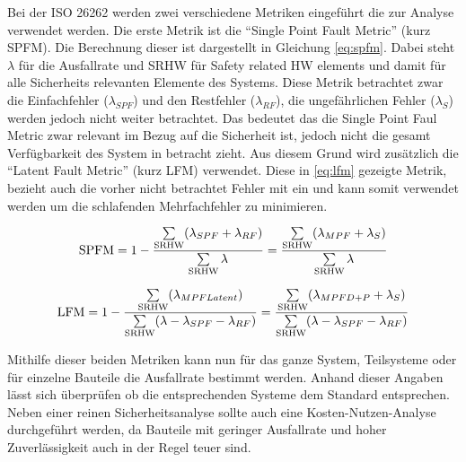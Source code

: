 \documentclass[a4paper,DIV=calc,ngerman]{scrartcl}
\begin{document}
Bei der ISO 26262 werden zwei verschiedene Metriken eingeführt die zur Analyse verwendet werden. Die erste Metrik ist die "`Single Point Fault Metric"' (kurz SPFM). Die Berechnung dieser ist dargestellt in Gleichung \ref{eq:spfm}. Dabei steht $ \lambda $ für die Ausfallrate und SRHW für Safety related HW elements und damit für alle Sicherheits relevanten Elemente des Systems. Diese Metrik betrachtet zwar die Einfachfehler ($ \lambda_{SPF} $) und den Restfehler ($ \lambda_{RF} $), die ungefährlichen Fehler ($ \lambda_{S} $) werden jedoch nicht weiter betrachtet. Das bedeutet das die Single Point Faul Metric zwar relevant im Bezug auf die Sicherheit ist, jedoch nicht die gesamt Verfügbarkeit des System in betracht zieht. Aus diesem Grund wird zusätzlich die "`Latent Fault Metric"' (kurz LFM) verwendet. Diese in \ref{eq:lfm} gezeigte Metrik, bezieht auch die vorher nicht betrachtet Fehler mit ein und kann somit verwendet werden um die schlafenden Mehrfachfehler zu minimieren. 


\begin{equation}
\textnormal{SPFM} = 1 - \frac{\sum\limits_{\textnormal{SRHW}} (\lambda_{SPF} + \lambda_{RF})}{\sum\limits_{\textnormal{SRHW}} \lambda} = \frac{\sum\limits_{\textnormal{SRHW}} (\lambda_{MPF} + \lambda_{S})}{\sum\limits_{\textnormal{SRHW}} \lambda}
\label{eq:spfm}
\end{equation}

\begin{equation}
\textnormal{LFM} = 1 - \frac{\sum\limits_{\textnormal{SRHW}} (\lambda_{MPF Latent})}{\sum\limits_{\textnormal{SRHW}} (\lambda - \lambda_{SPF} - \lambda_{RF})} = \frac{\sum\limits_{\textnormal{SRHW}} (\lambda_{MPF D+P} + \lambda_{S})}{\sum\limits_{\textnormal{SRHW}} (\lambda - \lambda_{SPF} - \lambda_{RF})}
\label{eq:lfm}
\end{equation}

Mithilfe dieser beiden Metriken kann nun für das ganze System, Teilsysteme oder für einzelne Bauteile die Ausfallrate bestimmt werden. Anhand dieser Angaben lässt sich überprüfen ob die entsprechenden Systeme dem Standard entsprechen. Neben einer reinen Sicherheitsanalyse sollte auch eine Kosten-Nutzen-Analyse durchgeführt werden, da Bauteile mit geringer Ausfallrate und hoher Zuverlässigkeit auch in der Regel teuer sind.

\end{document}

